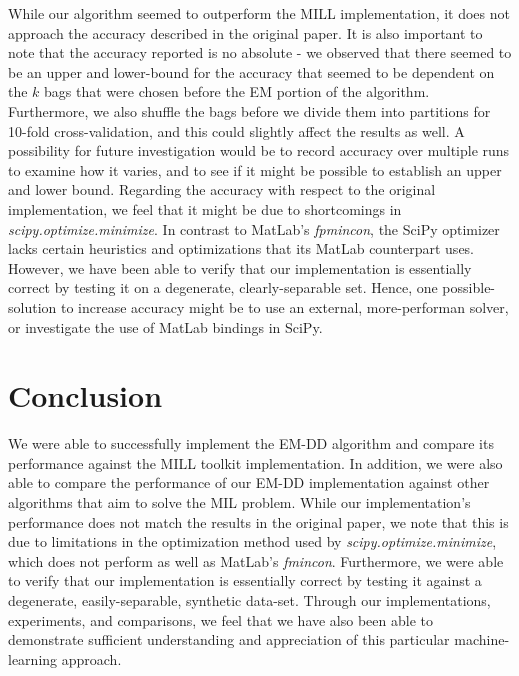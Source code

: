 \documentclass[conference]{IEEEtran}
\begin{document}
While our algorithm seemed to outperform the MILL implementation, it does not approach the accuracy described in the original paper. It is also important to note that the accuracy reported is no absolute - we observed that there seemed to be an upper and lower-bound for the accuracy that seemed to be dependent on the $k$ bags that were chosen before the EM portion of the algorithm. Furthermore, we also shuffle the bags before we divide them into partitions for 10-fold cross-validation, and this could slightly affect the results as well. A possibility for future investigation would be to record accuracy over multiple runs to examine how it varies, and to see if it might be possible to establish an upper and lower bound. Regarding the accuracy with respect to the original implementation, we feel that it might be due to shortcomings in \textit{scipy.optimize.minimize}. In contrast to MatLab's \textit{fpmincon}, the SciPy optimizer lacks certain heuristics and optimizations that its MatLab counterpart uses. However, we have been able to verify that our implementation is essentially correct by testing it on a degenerate, clearly-separable set. Hence, one possible-solution to increase accuracy might be to use an external, more-performan solver, or investigate the use of MatLab bindings in SciPy.

\section{Conclusion}

We were able to successfully implement the EM-DD algorithm and compare its performance against the MILL toolkit implementation. In addition, we were also able to compare the performance of our EM-DD implementation against other algorithms that aim to solve the MIL problem. While our implementation's performance does not match the results in the original paper, we note that this is due to limitations in the optimization method used by \textit{scipy.optimize.minimize}, which does not perform as well as MatLab's \textit{fmincon}. Furthermore, we were able to verify that our implementation is essentially correct by testing it against a degenerate, easily-separable, synthetic data-set. Through our implementations, experiments, and comparisons, we feel that we have also been able to demonstrate sufficient understanding and appreciation of this particular machine-learning approach. 

\end{document}
